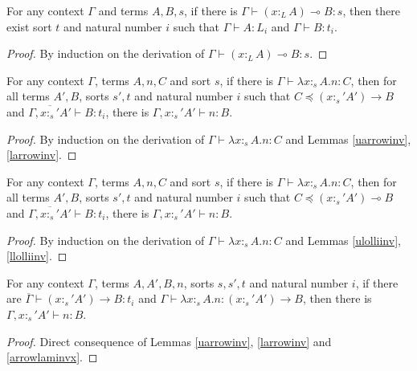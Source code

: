 \documentclass[sigplan,screen,review,anonymous]{acmart}
\newcommand{\ltype}{:_{\scriptscriptstyle L}}
\newcommand{\stype}[1]{:_#1}
\begin{document}
\begin{lemma}\label{llolliinv}
  For any context $\Gamma$ and terms $A, B, s$, if there is $\Gamma \vdash (x \ltype A)\multimap B : s$, then there exist sort $t$ and natural number $i$ such that $\Gamma \vdash A : L_i$ and $\Gamma \vdash B : t_i$.
\end{lemma}
\begin{proof}
  By induction on the derivation of $\Gamma \vdash (x \ltype A) \multimap B : s$.
\end{proof}

\begin{lemma}\label{arrowlaminvx}
  For any context $\Gamma$, terms $A, n, C$ and sort $s$, if there is $\Gamma \vdash \lambda x \stype{s} A . n : C$, then for all terms $A', B$, sorts $s', t$ and natural number $i$ such that $C \preceq (x \stype{s'} A') \rightarrow B$ and $\overline{\Gamma, x \stype{s'} A'} \vdash B : t_i$, there is $\Gamma, x \stype{s'} A' \vdash n : B$.
\end{lemma}
\begin{proof}
  By induction on the derivation of $\Gamma \vdash \lambda x \stype{s} A . n : C$ and Lemmas \ref{uarrowinv}, \ref{larrowinv}.
\end{proof}

\begin{lemma}\label{lollilaminvx}
  For any context $\Gamma$, terms $A, n, C$ and sort $s$, if there is $\Gamma \vdash \lambda x \stype{s} A . n : C$, then for all terms $A', B$, sorts $s', t$ and natural number $i$ such that $C \preceq (x \stype{s'} A') \multimap B$ and $\overline{\Gamma, x \stype{s'} A'} \vdash B : t_i$, there is $\Gamma, x \stype{s'} A' \vdash n : B$.
\end{lemma}
\begin{proof}
  By induction on the derivation of $\Gamma \vdash \lambda x \stype{s} A . n : C$ and Lemmas \ref{ulolliinv}, \ref{llolliinv}.
\end{proof}

\begin{lemma}\label{arrowlaminv}
  For any context $\Gamma$, terms $A, A', B, n$, sorts $s, s', t$ and natural number $i$, if there are $\overline{\Gamma} \vdash (x \stype{s'} A') \rightarrow B : t_i$ and $\Gamma \vdash \lambda x \stype{s} A . n : (x \stype{s'} A') \rightarrow B$, then there is $\Gamma, x \stype{s'} A' \vdash n : B$.
\end{lemma}
\begin{proof}
  Direct consequence of Lemmas \ref{uarrowinv}, \ref{larrowinv} and \ref{arrowlaminvx}.
\end{proof}
\end{document}

